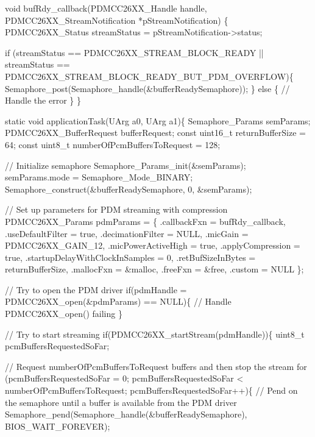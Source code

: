 \begin{DoxyCode}
\textcolor{keywordtype}{void} bufRdy\_callback(PDMCC26XX_Handle handle, PDMCC26XX_StreamNotification *pStreamNotification)
\{
    PDMCC26XX_Status streamStatus = pStreamNotification->status;

    \textcolor{keywordflow}{if} (streamStatus == PDMCC26XX_STREAM_BLOCK_READY || streamStatus == 
      PDMCC26XX_STREAM_BLOCK_READY_BUT_PDM_OVERFLOW)\{
        Semaphore\_post(Semaphore\_handle(&bufferReadySemaphore));
    \}
    \textcolor{keywordflow}{else} \{
        \textcolor{comment}{// Handle the error}
    \}
\}

\textcolor{keyword}{static} \textcolor{keywordtype}{void} applicationTask(UArg a0, UArg a1)\{
    Semaphore\_Params semParams;
    PDMCC26XX_BufferRequest bufferRequest;
    \textcolor{keyword}{const} uint16\_t returnBufferSize = 64;
    \textcolor{keyword}{const} uint8\_t numberOfPcmBuffersToRequest = 128;

    \textcolor{comment}{// Initialize semaphore}
    Semaphore\_Params\_init(&semParams);
    semParams.mode = Semaphore\_Mode\_BINARY;
    Semaphore\_construct(&bufferReadySemaphore, 0, &semParams);

    \textcolor{comment}{// Set up parameters for PDM streaming with compression}
    PDMCC26XX_Params pdmParams = \{
        .callbackFxn = bufRdy\_callback,
        .useDefaultFilter = \textcolor{keyword}{true},
        .decimationFilter = NULL,
        .micGain = PDMCC26XX_GAIN_12,
        .micPowerActiveHigh = \textcolor{keyword}{true},
        .applyCompression = \textcolor{keyword}{true},
        .startupDelayWithClockInSamples = 0,
        .retBufSizeInBytes = returnBufferSize,
        .mallocFxn = &malloc,
        .freeFxn = &free,
        .custom = NULL
    \};

    \textcolor{comment}{// Try to open the PDM driver}
    \textcolor{keywordflow}{if}(pdmHandle = PDMCC26XX_open(&pdmParams) == NULL)\{
        \textcolor{comment}{// Handle PDMCC26XX\_open() failing}
    \}

    \textcolor{comment}{// Try to start streaming}
    \textcolor{keywordflow}{if}(PDMCC26XX_startStream(pdmHandle))\{
        uint8\_t pcmBuffersRequestedSoFar;

        \textcolor{comment}{// Request numberOfPcmBuffersToRequest buffers and then stop the stream}
        \textcolor{keywordflow}{for} (pcmBuffersRequestedSoFar = 0; pcmBuffersRequestedSoFar < numberOfPcmBuffersToRequest; 
      pcmBuffersRequestedSoFar++)\{
            \textcolor{comment}{// Pend on the semaphore until a buffer is available from the PDM driver}
            Semaphore\_pend(Semaphore\_handle(&bufferReadySemaphore), BIOS\_WAIT\_FOREVER);


\end{DoxyCode}
